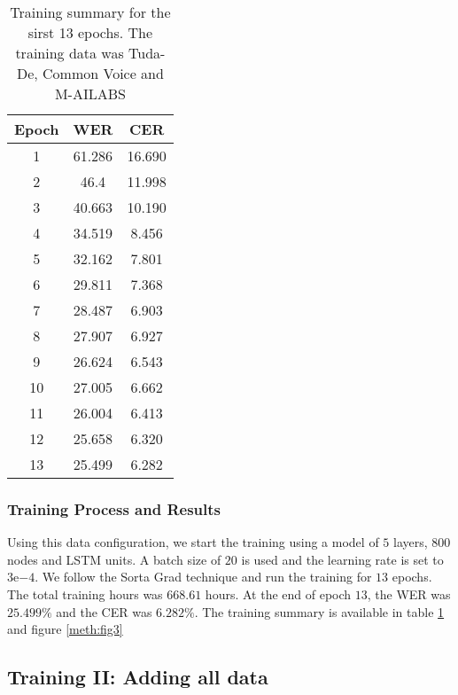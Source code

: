 \begin{table}[!ht]
	\centering
	\begin{tabular}{|c|c|c|}
		\hline
		Epoch & WER    & CER    \\ \hline
		1     & 61.286 & 16.690 \\ \hline
		2     & 46.4 & 11.998 \\ \hline
		3     & 40.663 & 10.190 \\ \hline
		4     & 34.519 & 8.456  \\ \hline
		5     & 32.162 & 7.801  \\ \hline
		6     & 29.811 & 7.368  \\ \hline
		7     & 28.487 & 6.903  \\ \hline
		8     & 27.907 & 6.927  \\ \hline
		9     & 26.624 & 6.543  \\ \hline
		10    & 27.005 & 6.662  \\ \hline
		11    & 26.004 & 6.413  \\ \hline
		12    & 25.658 & 6.320  \\ \hline
		13    & 25.499 & 6.282  \\ \hline
	\end{tabular}
	\caption{Training summary for the sirst 13 epochs. The training data was Tuda-De, Common Voice and M-AILABS}
	\label{meth:table2}
\end{table}


\subsubsection{Training Process and Results}
\label{meth:s4_sub3_subsub2}

Using this data configuration, we start the training using a model of $5$ layers, $800$ nodes and \ac{LSTM} units. A batch size of $20$ is used and the learning rate is set to $3\mathrm{e}{-4}$. We follow the Sorta Grad technique and run the training for $13$ epochs. The total training hours was $668.61$ hours. At the end of epoch $13$, the \ac{WER} was $25.499\%$ and the \ac{CER} was $6.282\%$. The training summary is available in table \ref{meth:table2} and figure \ref{meth:fig3}


\subsection{Training II: Adding all data} 
\label{meth:s4_sub4}

